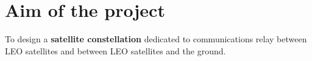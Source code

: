\chapter{Aim of the project}
To design a \textbf{satellite constellation} dedicated to  communications relay between LEO satellites and between LEO satellites and the ground.